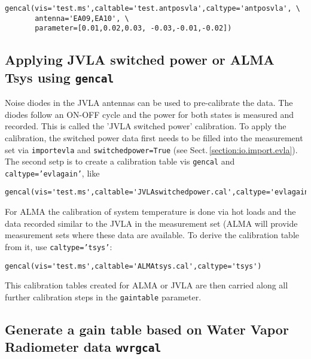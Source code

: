 \small
\begin{verbatim}
gencal(vis='test.ms',caltable='test.antposvla',caltype='antposvla', \
       antenna='EA09,EA10', \
       parameter=[0.01,0.02,0.03, -0.03,-0.01,-0.02])
\end{verbatim}
\normalsize
\subsection{Applying JVLA switched power  or ALMA Tsys
   using {\tt gencal}}
\label{section:cal.prior.gencalevlagains}
Noise diodes in the JVLA antennas can be used to pre-calibrate the
data. The diodes follow an ON-OFF cycle and the power for both states is
measured and recorded. This is called the 'JVLA switched power'
calibration. To apply the calibration, the switched power data first needs to be
filled into the measurement set via {\tt importevla} and {\tt switchedpower=True}
(see Sect.\,\ref{section:io.import.evla}). The second setp is to
create a calibration table vis {\tt gencal} and {\tt
  caltype='evlagain'}, like 

\small
\begin{verbatim}
gencal(vis='test.ms',caltable='JVLAswitchedpower.cal',caltype='evlagain')
\end{verbatim}
\normalsize

For ALMA the calibration of system temperature is done via hot loads
and the data recorded similar to the JVLA in the measurement set (ALMA
will provide measurement sets where these data are available. To
derive the calibration table from it, use {\tt caltype='tsys'}:

\small
\begin{verbatim}
gencal(vis='test.ms',caltable='ALMAtsys.cal',caltype='tsys')
\end{verbatim}
\normalsize


This calibration tables created for ALMA or JVLA are then carried
along all further calibration steps in the {\tt gaintable} parameter.

\subsection{ Generate a gain table based on Water Vapor Radiometer data {\tt wvrgcal}}
\label{section:cal.prior.wvrgcal}

